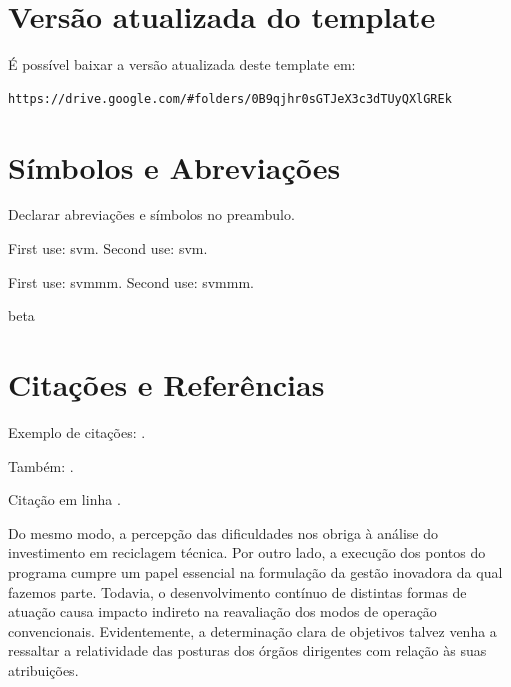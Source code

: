 \documentclass[a4paper,12pt]{udesc}
\begin{document}





%






\chapter{Versão atualizada do template}

É possível baixar a versão atualizada deste template em:


\begin{verbatim}
https://drive.google.com/#folders/0B9qjhr0sGTJeX3c3dTUyQXlGREk
\end{verbatim}


\chapter{Símbolos e Abreviações}

Declarar abreviações e símbolos no preambulo.


First use: \gls{svm}. Second use: \gls{svm}.

First use: \gls{svmmm}. Second use: \gls{svmmm}.



\gls{beta}








\chapter{Citações e Referências}

Exemplo de citações: \cite{RW89}.

Também: \cite{CASS99}. 

Citação em linha .


          Do mesmo modo, a percepção das dificuldades nos obriga à análise do investimento em reciclagem técnica. Por outro lado, a execução dos pontos do programa cumpre um papel essencial na formulação da gestão inovadora da qual fazemos parte. Todavia, o desenvolvimento contínuo de distintas formas de atuação causa impacto indireto na reavaliação dos modos de operação convencionais. Evidentemente, a determinação clara de objetivos talvez venha a ressaltar a relatividade das posturas dos órgãos dirigentes com relação às suas atribuições.
\end{document}
